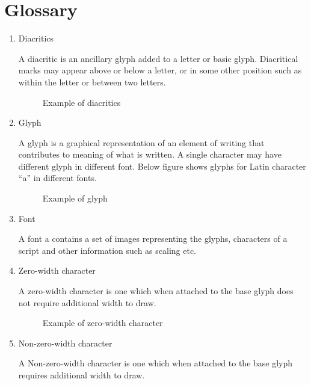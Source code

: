 \chapter{Glossary}
\begin{enumerate}
\item Diacritics

A diacritic is an ancillary glyph added to a letter or basic glyph. Diacritical marks may appear above or below a letter, or in some other position such as within the letter or between two letters.

\begin{figure}[htbp]
\centerline{}
\caption{Example of diacritics} \label{Gnome Terminal15}
\end{figure}

\item Glyph

A glyph is a graphical representation of an element of writing that contributes to meaning of what is written. A single character may have different glyph in different font. Below figure shows glyphs for Latin character ``a'' in different fonts.

\begin{figure}[htbp]
\centerline{}
\caption{Example of glyph} \label{Gnome Terminal19}
\end{figure}

\item Font

A font a contains a set of images representing the glyphs, characters of a script and other information such as scaling etc.

\item Zero-width character

A zero-width character is one which when attached to the base glyph does not require additional width to draw.

\begin{figure}[htbp]
\centerline{}
\caption{Example of zero-width character} \label{Gnome Terminal16}
\end{figure}
  
\item Non-zero-width character

A Non-zero-width character is one which when attached to the base glyph requires additional width to draw. 


\end{enumerate}
